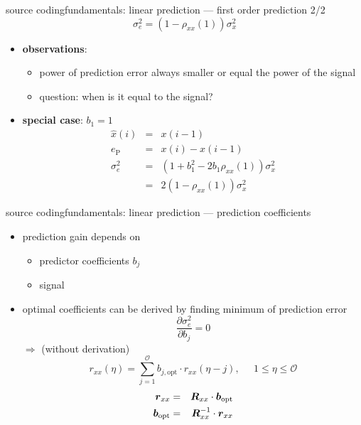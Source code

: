 	\begin{frame}{source coding}{fundamentals: linear prediction --- first order prediction 2/2}
        \begin{equation*}
            \sigma_e^2 = (1-\rho_{xx}(1))\sigma_x^2
        \end{equation*}
        
        \begin{itemize}
            \item             \textbf{observations}:
            \begin{itemize}
                \item   power of prediction error always smaller or equal the power of the signal
                \item   question: when is it equal to the signal?
            \end{itemize}
            \bigskip
            \item<2->   \textbf{special case}: $b_1 = 1$
                \begin{eqnarray*}
                    \hat{x}(i) &=& x(i-1)\\
                    e_\mathrm{P} &=& x(i) - x(i-1)\\
                    \sigma_e^2 &=& (1 + b_1^2 -2b_1\rho_{xx}(1))\sigma_x^2\\
                    &=& 2(1-\rho_{xx}(1))\sigma_x^2
                \end{eqnarray*}
        \end{itemize}
	\end{frame}
	\begin{frame}{source coding}{fundamentals: linear prediction --- prediction coefficients}
		\begin{itemize}
			\item	prediction gain depends on
				\begin{itemize}
					\item	predictor coefficients $b_j$
					\item	signal
				\end{itemize}
			\pause
			\item	optimal coefficients can be derived by finding minimum of prediction error
				\begin{equation*}
					\frac{\partial \sigma_e^2}{\partial b_j} = 0
				\end{equation*}
				$\Rightarrow$ (without derivation)
			\begin{equation*}
				r_{xx}(\eta) = \sum\limits_{j=1}^{\mathcal{O}}{b_{j,\mathrm{opt}}\cdot r_{xx}(\eta-j)} ,\;\;\;\;\; 1 \leq\eta\leq\mathcal{O} 
			\end{equation*}	
            \begin{eqnarray*}
                \vec{r}_{xx} &=& \mat{R}_{xx}\cdot \vec{b}_\mathrm{opt}\\
                \vec{b}_\mathrm{opt} &=& \mat{R}_{xx}^{-1}\cdot \vec{r}_{xx}
            \end{eqnarray*}
		\end{itemize}						
	\end{frame}

